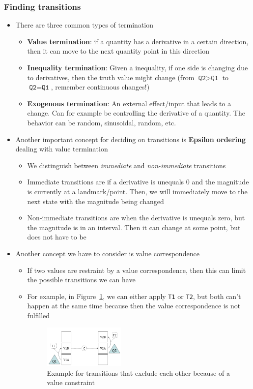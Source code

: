 \subsubsection{Finding transitions}
\begin{itemize}
	\item There are three common types of termination 
	\begin{itemize}
		\item \textbf{Value termination}: if a quantity has a derivative in a certain direction, then it can move to the next quantity point in this direction
		\item \textbf{Inequality termination}: Given a inequality, if one side is changing due to derivatives, then the truth value might change (from $\texttt{Q2}>\texttt{Q1}$ to $\texttt{Q2}=\texttt{Q1}$, remember continuous changes!)
		\item \textbf{Exogenous termination}: An external effect/input that leads to a change. Can for example be controlling the derivative of a quantity. The behavior can be random, sinusoidal, random, etc.
	\end{itemize}
	\item Another important concept for deciding on transitions is \textbf{Epsilon ordering} dealing with value termination
	\begin{itemize}
		\item We distinguish between \textit{immediate} and \textit{non-immediate} transitions
		\item Immediate transitions are if a derivative is unequals 0 and the magnitude is currently at a landmark/point. Then, we will immediately move to the next state with the magnitude being changed
		\item Non-immediate transitions are when the derivative is unequals zero, but the magnitude is in an interval. Then it can change at some point, but does not have to be
	\end{itemize}
	\item Another concept we have to consider is value correspondence
	\begin{itemize}
		\item If two values are restraint by a value correspondence, then this can limit the possible transitions we can have
		\item For example, in Figure~\ref{fig:kr_qr_value_correspondence_termination}, we can either apply \texttt{T1} or \texttt{T2}, but both can't happen at the same time because then the value correspondence is not fulfilled
		\begin{figure}[ht!]
			\centering
			\includegraphics[width=0.4\textwidth]{figures/kr_qr_value_correspondence_termination.png}
			\caption{Example for transitions that exclude each other because of a value constraint}
			\label{fig:kr_qr_value_correspondence_termination}
		\end{figure}
	\end{itemize}
\end{itemize}
